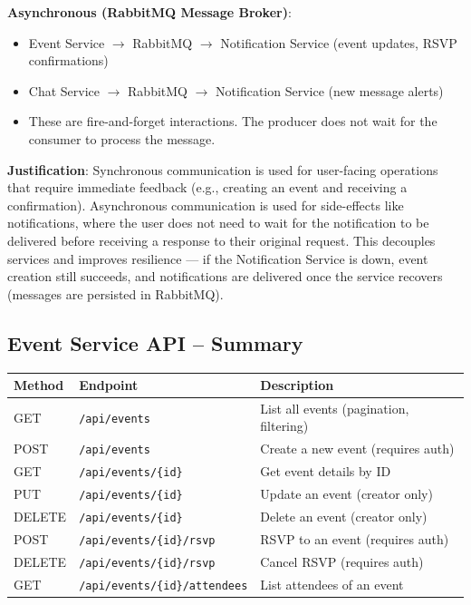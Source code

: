 \documentclass[12pt,a4paper]{article}
\begin{document}
\textbf{Asynchronous (RabbitMQ Message Broker)}:
\begin{itemize}
    \item Event Service $\rightarrow$ RabbitMQ $\rightarrow$ Notification Service (event updates, RSVP confirmations)
    \item Chat Service $\rightarrow$ RabbitMQ $\rightarrow$ Notification Service (new message alerts)
    \item These are fire-and-forget interactions. The producer does not wait for the consumer to process the message.
\end{itemize}

\textbf{Justification}: Synchronous communication is used for user-facing operations that require immediate feedback (e.g., creating an event and receiving a confirmation). Asynchronous communication is used for side-effects like notifications, where the user does not need to wait for the notification to be delivered before receiving a response to their original request. This decouples services and improves resilience --- if the Notification Service is down, event creation still succeeds, and notifications are delivered once the service recovers (messages are persisted in RabbitMQ).

\subsection{Event Service API -- Summary}

\begin{longtable}{@{}p{1.8cm}p{5.5cm}p{6.5cm}@{}}
\toprule
\textbf{Method} & \textbf{Endpoint} & \textbf{Description} \\
\midrule
\endhead
GET & \texttt{/api/events} & List all events (pagination, filtering) \\
\midrule
POST & \texttt{/api/events} & Create a new event (requires auth) \\
\midrule
GET & \texttt{/api/events/\{id\}} & Get event details by ID \\
\midrule
PUT & \texttt{/api/events/\{id\}} & Update an event (creator only) \\
\midrule
DELETE & \texttt{/api/events/\{id\}} & Delete an event (creator only) \\
\midrule
POST & \texttt{/api/events/\{id\}/rsvp} & RSVP to an event (requires auth) \\
\midrule
DELETE & \texttt{/api/events/\{id\}/rsvp} & Cancel RSVP (requires auth) \\
\midrule
GET & \texttt{/api/events/\{id\}/attendees} & List attendees of an event \\
\bottomrule
\end{longtable}
\end{document}
